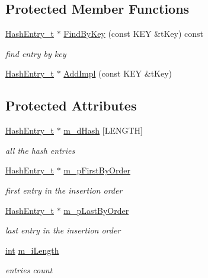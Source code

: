 \subsection*{Protected Member Functions}
\begin{DoxyCompactItemize}
\item 
\hyperlink{structCSphOrderedHash_1_1HashEntry__t}{Hash\-Entry\-\_\-t} $\ast$ \hyperlink{classCSphOrderedHash_a70d4f61e49244a361238c8275db95356}{Find\-By\-Key} (const K\-E\-Y \&t\-Key) const 
\begin{DoxyCompactList}\small\item\em find entry by key \end{DoxyCompactList}\item 
\hyperlink{structCSphOrderedHash_1_1HashEntry__t}{Hash\-Entry\-\_\-t} $\ast$ \hyperlink{classCSphOrderedHash_a8b1463a8bb0731bf19e796f3e6b660dc}{Add\-Impl} (const K\-E\-Y \&t\-Key)
\end{DoxyCompactItemize}
\subsection*{Protected Attributes}
\begin{DoxyCompactItemize}
\item 
\hyperlink{structCSphOrderedHash_1_1HashEntry__t}{Hash\-Entry\-\_\-t} $\ast$ \hyperlink{classCSphOrderedHash_a1abcb449596527f25444484b7d50dc9f}{m\-\_\-d\-Hash} \mbox{[}L\-E\-N\-G\-T\-H\mbox{]}
\begin{DoxyCompactList}\small\item\em all the hash entries \end{DoxyCompactList}\item 
\hyperlink{structCSphOrderedHash_1_1HashEntry__t}{Hash\-Entry\-\_\-t} $\ast$ \hyperlink{classCSphOrderedHash_a5c5de4c3874059e02c6a3754881dd181}{m\-\_\-p\-First\-By\-Order}
\begin{DoxyCompactList}\small\item\em first entry in the insertion order \end{DoxyCompactList}\item 
\hyperlink{structCSphOrderedHash_1_1HashEntry__t}{Hash\-Entry\-\_\-t} $\ast$ \hyperlink{classCSphOrderedHash_abd1445b98881815257ff731a0b409886}{m\-\_\-p\-Last\-By\-Order}
\begin{DoxyCompactList}\small\item\em last entry in the insertion order \end{DoxyCompactList}\item 
\hyperlink{sphinxexpr_8cpp_a4a26e8f9cb8b736e0c4cbf4d16de985e}{int} \hyperlink{classCSphOrderedHash_a4486f2e47eff93bb9f8ea00237cd8ebc}{m\-\_\-i\-Length}
\begin{DoxyCompactList}\small\item\em entries count \end{DoxyCompactList}\end{DoxyCompactItemize}
